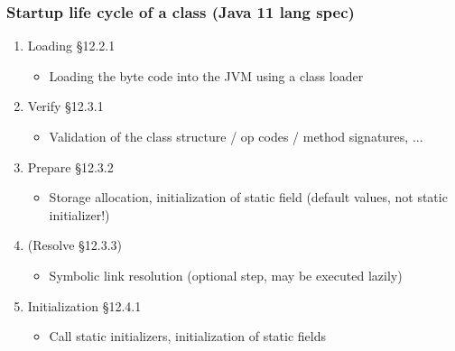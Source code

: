 \documentclass[aspectratio=169]{beamer}
\begin{document}
\begin{frame}
	\frametitle{Startup life cycle of a class (Java 11 lang spec)}
	\begin{enumerate}
		\item{Loading §12.2.1}
			\begin{itemize}
				\item{Loading the byte code into the JVM using a class loader}
			\end{itemize}
		\item{Verify §12.3.1}
			\begin{itemize}
				\item{Validation of the class structure / op codes / method signatures, ...}
			\end{itemize}
		\item{Prepare §12.3.2}
			\begin{itemize}
				\item{Storage allocation, initialization of static field (default values, not static initializer!)}
			\end{itemize}
		\item{(Resolve §12.3.3)}
			\begin{itemize}
				\item{Symbolic link resolution (optional step, may be executed lazily)}
			\end{itemize}
		\item{Initialization §12.4.1}
			\begin{itemize}
				\item{Call static initializers, initialization of static fields}
			\end{itemize}
	\end{enumerate}
\end{frame}
\end{document}
